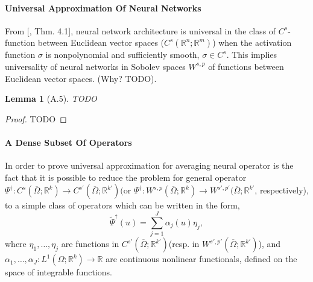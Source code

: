 \documentclass[reqno]{amsart}
\theoremstyle{plain}
\newtheorem{lem}{Lemma}
\theoremstyle{definition}
\newcommand{\bb}[1]{\mathbb{#1}}
\begin{document}
\paragraph{\bf Universal Approximation Of Neural Networks}
From [\cite{AP1999}, Thm. 4.1], neural network architecture is universal in the class of $C^s$- function between Euclidean vector spaces ($C^s(\bb R^n; \bb R^m)$) when the activation function $\sigma$ is nonpolynomial and sufficiently smooth, $\sigma \in C^s$. This implies universality of neural networks in Sobolev spaces $W^{s,p}$ of functions between Euclidean vector spaces. (Why? TODO).
\begin{lem}[A.5] TODO
\end{lem}
\begin{proof}
    TODO
\end{proof}
\paragraph{\bf A Dense Subset Of Operators}
In order to prove universal approximation for averaging neural operator is the fact that it is possible to reduce the problem for general operator $\Psi^\dag :C^s(\overline{\Omega};\bb R^k) \to C^{s'}(\overline{\Omega};\bb R^{k'})($or $\Psi^\dag :W^{s,p}(\overline{\Omega};\bb R^k) \to W^{s',p'}(\overline{\Omega};\bb R^{k'}$, respectively), to a simple class of operators which can be written in the form,
$$ \tilde{\Psi}^\dag(u) = \sum\limits_{j=1}^{J}\alpha_j(u)\eta_j,$$
where $\eta_1,\dots,\eta_j$ are functions in $C^{s'}(\overline{\Omega};\bb R^{k'})$(resp. in $W^{s',p'}(\overline{\Omega};\bb R^{k'})$), and $\alpha_1,\dots,\alpha_J:L^1(\Omega;\bb R^k) \to \bb R$ are continuous nonlinear functionals, defined on the space of integrable functions.


\end{document}
